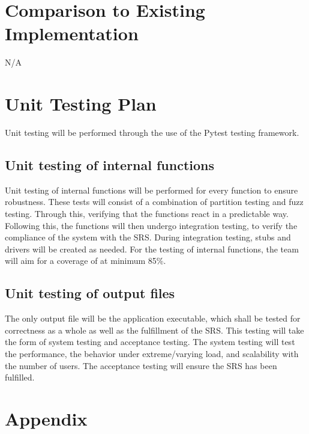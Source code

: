 \documentclass[12pt, titlepage]{article}
\begin{document}
\section{Comparison to Existing Implementation}
N/A

\section{Unit Testing Plan}
Unit testing will be performed through the use of the Pytest testing framework.

\subsection{Unit testing of internal functions}
Unit testing of internal functions will be performed for every function to ensure robustness. These tests will consist of a combination of partition testing and fuzz testing. Through this, verifying that the functions react in a predictable way. Following this, the functions will then undergo integration testing, to verify the compliance of the system with the SRS. During integration testing, stubs and drivers will be created as needed. For the testing of internal functions, the team will aim for a coverage of at minimum 85\%.

\subsection{Unit testing of output files}		
The only output file will be the application executable, which shall be tested for correctness as a whole as well as the fulfillment of the SRS. This testing will take the form of system testing and acceptance testing. The system testing will test the performance, the behavior under extreme/varying load, and scalability with the number of users. The acceptance testing will ensure the SRS has been fulfilled.



\newpage

\section{Appendix}


\end{document}
